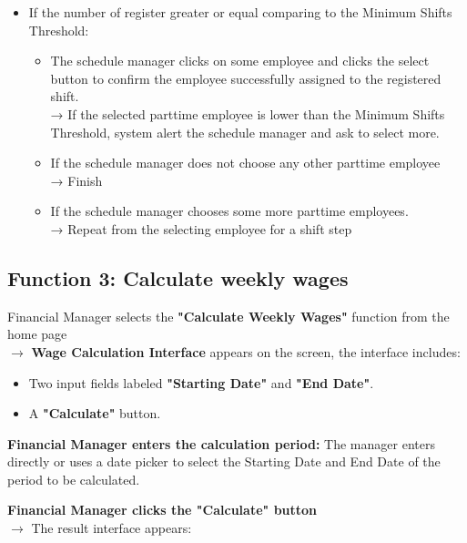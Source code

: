 \begin{itemize}
\begin{itemize}
\begin{itemize}
\begin{itemize}
                    \end{itemize}
                \item If the number of register greater or equal comparing to the Minimum Shifts Threshold:
                    \begin{itemize}
                        \item The schedule manager clicks on some employee and clicks the select button to confirm the employee successfully assigned to the registered shift.\\
                        → If the selected parttime employee is lower than the Minimum Shifts Threshold, system alert the schedule manager and ask to select more.
                        \item If the schedule manager does not choose any other parttime employee\\
                        → Finish
                        \item If the schedule manager chooses some more parttime employees.\\
                        → Repeat from the selecting employee for a shift step
                    \end{itemize}
            \end{itemize}
        \end{itemize}
\end{itemize}

\subsection{Function 3: Calculate weekly wages}

Financial Manager selects the \textbf{"Calculate Weekly Wages"} function from the home page\\
$\rightarrow$ \textbf{Wage Calculation Interface} appears on the screen, the interface includes:

\begin{itemize}
    \item Two input fields labeled \textbf{"Starting Date"} and \textbf{"End Date"}.
    \item A \textbf{"Calculate"} button.
\end{itemize}

\textbf{Financial Manager enters the calculation period:} The manager enters directly or uses a date picker to select the Starting Date and End Date of the period to be calculated.

\textbf{Financial Manager clicks the "Calculate" button}\\
$\rightarrow$ The result interface appears:

